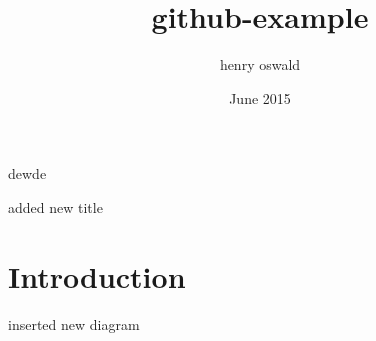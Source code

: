 \documentclass{article}
\title{github-example}
\author{henry oswald}
\date{June 2015}
\begin{document}
dewde
\maketitle
added new title
\section{Introduction}
inserted new diagram
\end{document}
